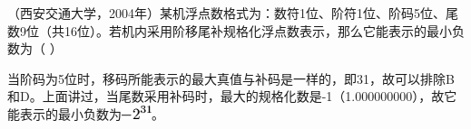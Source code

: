\question （西安交通大学，2004年）某机浮点数格式为：数符1位、阶符1位、阶码5位、尾数9位（共16位）。若机内采用阶移尾补规格化浮点数表示，那么它能表示的最小负数为（
）
\par\fourch{\textcolor{red}{}}{}{}{}
\begin{solution}当阶码为5位时，移码所能表示的最大真值与补码是一样的，即31，故可以排除B和D。上面讲过，当尾数采用补码时，最大的规格化数是-1（1.000000000），故它能表示的最小负数为\includegraphics[width=0.34375in,height=0.15625in]{texmath/ea62b55Cdpi7B3507D-25E7B317D}。
\end{solution}
